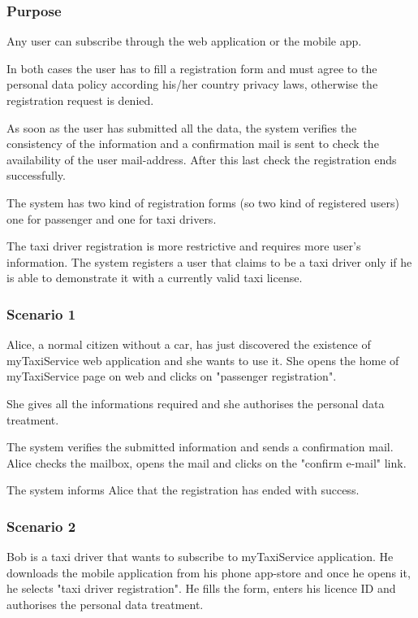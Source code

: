 \label{user-registration}
\subsubsection{Purpose}
Any user can subscribe through the web application or the mobile app. 

In both cases the user has to fill a registration form and must agree to the personal data policy according his/her country privacy laws, otherwise the registration request is denied.

As soon as the user has submitted all the data, the system verifies the consistency of the information and a confirmation mail is sent to check the availability of the user mail-address.  After this last check the registration ends successfully.

The system has two kind of registration forms (so two kind of registered users) one for passenger and one for taxi drivers.

The taxi driver registration is more restrictive and requires more user's information.
The system registers a user that claims to be a taxi driver only if he is able to demonstrate it with a currently valid taxi license.


\subsubsection{Scenario 1}
Alice, a normal citizen without a car, has just discovered the existence of myTaxiService web application and she wants to use it. 
She opens the home of myTaxiService page on web and clicks on "passenger registration". 

She gives all the informations required and she authorises the personal data treatment. 

The system verifies the submitted information and sends a confirmation mail.
Alice checks the mailbox, opens the mail and clicks on the "confirm e-mail" link. 

The system informs Alice that the registration has ended with success.

\subsubsection{Scenario 2}
Bob is a taxi driver that wants to subscribe to myTaxiService application. 
He downloads the mobile application from his phone app-store and once he opens it, he selects "taxi driver registration". 
He fills the form, enters his licence ID and authorises the personal data treatment.


